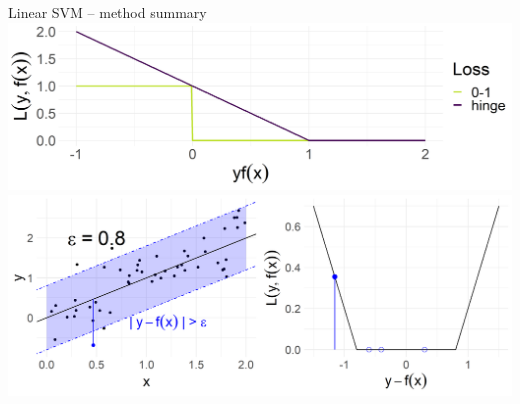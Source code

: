 \documentclass[11pt,compress,t,notes=noshow, xcolor=table]{beamer}
\begin{document}
\begin{frame2}{Linear SVM -- method summary}
{}{
  \centering
\includegraphics[height=\textwidth, keepaspectratio=true]{
figure/plot_loss_hinge.png}
\includegraphics[height=\textwidth, keepaspectratio=true]{
figure/loss_eps_insensitive.png}
}

\end{frame2}
\end{document}
